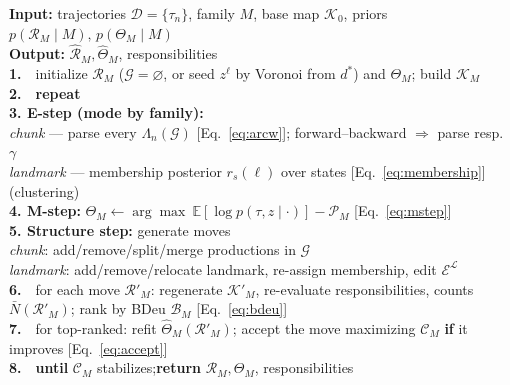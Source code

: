 \documentclass[10pt]{article}
\begin{document}
\begin{algorithm}[H]
\caption{Bayesian Structural EM for agent structure learning}
\label{alg:bsem}
\small
\begin{flushleft}
\textbf{Input:} trajectories $\mathcal D=\{\tau_n\}$, family $M$, base map $\mathcal K_0$,
priors $p(\mathcal R_M\mid M),\,p(\Theta_M\mid M)$\\
\textbf{Output:} $\widehat{\mathcal R}_M,\widehat\Theta_M$, responsibilities\\[3pt]
\textbf{1.}\ \ initialize $\mathcal R_M$ ($\mathcal G=\varnothing$, or seed $z^{\ell}$ by Voronoi from $d^{*}$) and $\Theta_M$; build $\mathcal K_M$\\
\textbf{2.}\ \ \textbf{repeat}\\
\hspace*{1.4em}\textbf{3. E-step (mode by family):}\\
\hspace*{3.0em}\emph{chunk} --- parse every $\Lambda_n(\mathcal G)$ [Eq.~\eqref{eq:arcw}]; forward--backward $\Rightarrow$ parse resp.\ $\gamma$\\
\hspace*{3.0em}\emph{landmark} --- membership posterior $r_s(\ell)$ over states [Eq.~\eqref{eq:membership}] (clustering)\\
\hspace*{1.4em}\textbf{4. M-step:} $\Theta_M\gets\arg\max\ \mathbb E[\log p(\tau,z\mid\cdot)]-\mathcal P_M$ [Eq.~\eqref{eq:mstep}]\\
\hspace*{1.4em}\textbf{5. Structure step:} generate moves\\
\hspace*{3.0em}\emph{chunk}: add/remove/split/merge productions in $\mathcal G$\\
\hspace*{3.0em}\emph{landmark}: add/remove/relocate landmark, re-assign membership, edit $\mathcal E^{\mathcal L}$\\
\hspace*{1.4em}\textbf{6.}\ \ for each move $\mathcal R'_M$: regenerate $\mathcal K'_M$, re-evaluate responsibilities, counts $\bar N(\mathcal R'_M)$; rank by BDeu $\mathcal B_M$ [Eq.~\eqref{eq:bdeu}]\\
\hspace*{1.4em}\textbf{7.}\ \ for top-ranked: refit $\widehat\Theta_M(\mathcal R'_M)$; accept the move maximizing $\mathcal C_M$ \textbf{if} it improves [Eq.~\eqref{eq:accept}]\\
\textbf{8.}\ \ \textbf{until} $\mathcal C_M$ stabilizes;\quad\textbf{return} $\mathcal R_M,\Theta_M$, responsibilities
\end{flushleft}
\end{algorithm}
\end{document}
